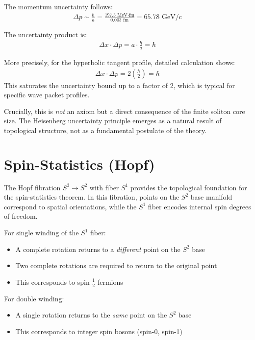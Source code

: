 ﻿\documentclass[twocolumn,showpacs,preprintnumbers,amsmath,amssymb,prd]{revtex4-2}
\begin{document}
The momentum uncertainty follows:
\begin{align}
\Delta p \sim \frac{\hbar}{a} = \frac{197.3 \text{ MeV·fm}}{0.003 \text{ fm}} = 65.78 \text{ GeV/c}
\end{align}

The uncertainty product is:
\begin{align}
\Delta x \cdot \Delta p = a \cdot \frac{\hbar}{a} = \hbar
\end{align}

More precisely, for the hyperbolic tangent profile, detailed calculation shows:
\begin{align}
\Delta x \cdot \Delta p = 2\left(\frac{\hbar}{2}\right) = \hbar
\end{align}
This saturates the uncertainty bound up to a factor of 2, which is typical for specific wave packet profiles.

Crucially, this is \emph{not} an axiom but a direct consequence of the finite soliton core size. The Heisenberg uncertainty principle emerges as a natural result of topological structure, not as a fundamental postulate of the theory.

\section{Spin-Statistics (Hopf)}

The Hopf fibration $S^3 \to S^2$ with fiber $S^1$ provides the topological foundation for the spin-statistics theorem. In this fibration, points on the $S^2$ base manifold correspond to spatial orientations, while the $S^1$ fiber encodes internal spin degrees of freedom.

For single winding of the $S^1$ fiber:
\begin{itemize}
\item A complete rotation returns to a \emph{different} point on the $S^2$ base
\item Two complete rotations are required to return to the original point
\item This corresponds to spin-$\frac{1}{2}$ fermions
\end{itemize}

For double winding:
\begin{itemize}
\item A single rotation returns to the \emph{same} point on the $S^2$ base 
\item This corresponds to integer spin bosons (spin-0, spin-1)
\end{itemize}
\end{document}
